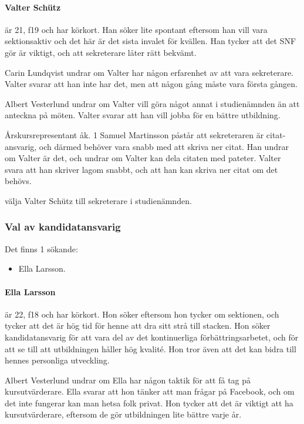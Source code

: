 \documentclass[hidelinks]{sektionsmote}
\begin{document}
\paragraph{Valter Schütz} är 21, f19 och har körkort.
Han söker lite spontant eftersom han vill vara sektionsaktiv och det här är det sista invalet för kvällen.
Han tycker att det SNF gör är viktigt, och att sekreterare låter rätt bekvämt.

Carin Lundqvist undrar om Valter har någon erfarenhet av att vara sekreterare.
Valter svarar att han inte har det, men att någon gång måste vara första gången.

Albert Vesterlund undrar om Valter vill göra något annat i studienämnden än att anteckna på möten.
Valter svarar att han vill jobba för en bättre utbildning.

Årskursrepresentant åk. 1 Samuel Martinsson påstår att sekreteraren är citat-ansvarig, och därmed behöver vara snabb med att skriva ner citat.
Han undrar om Valter är det, och undrar om Valter kan dela citaten med pateter.
Valter svara att han skriver lagom snabbt, och att han kan skriva ner citat om det behövs.

\begin{beslut}
  \item välja Valter Schütz till sekreterare i studienämnden.
\end{beslut}

\subsubsection{Val av kandidatansvarig}
Det finns 1 sökande:
\begin{itemize}
    \item Ella Larsson.
\end{itemize}

\paragraph{Ella Larsson} är 22, f18 och har körkort.
Hon söker eftersom hon tycker om sektionen, och tycker att det är hög tid för henne att dra sitt strå till stacken.
Hon söker kandidatansvarig för att vara del av det kontinuerliga förbättringsarbetet, och för att se till att utbildningen håller hög kvalité.
Hon tror även att det kan bidra till hennes personliga utveckling.

Albert Vesterlund undrar om Ella har någon taktik för att få tag på kursutvärderare.
Ella svarar att hon tänker att man frågar på Facebook, och om det inte fungerar kan man hetsa folk privat.
Hon tycker att det är viktigt att ha kursutvärderare, eftersom de gör utbildningen lite bättre varje år.
\end{document}
